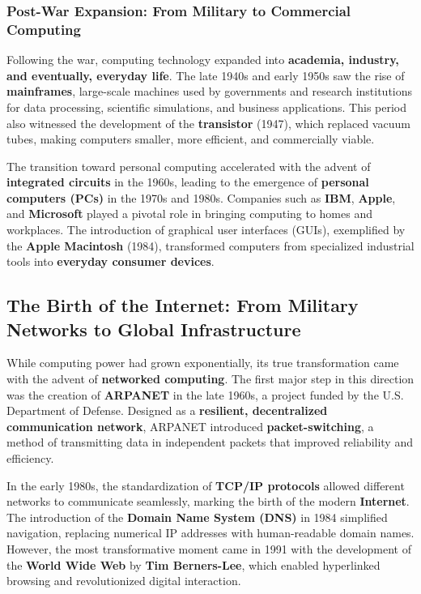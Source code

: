\subsubsection{Post-War Expansion: From Military to Commercial Computing}

Following the war, computing technology expanded into \textbf{academia, industry, and eventually, everyday life}. The late 1940s and early 1950s saw the rise of \textbf{mainframes}, large-scale machines used by governments and research institutions for data processing, scientific simulations, and business applications. This period also witnessed the development of the \textbf{transistor} (1947), which replaced vacuum tubes, making computers smaller, more efficient, and commercially viable.

The transition toward personal computing accelerated with the advent of \textbf{integrated circuits} in the 1960s, leading to the emergence of \textbf{personal computers (PCs)} in the 1970s and 1980s. Companies such as \textbf{IBM}, \textbf{Apple}, and \textbf{Microsoft} played a pivotal role in bringing computing to homes and workplaces. The introduction of graphical user interfaces (GUIs), exemplified by the \textbf{Apple Macintosh} (1984), transformed computers from specialized industrial tools into \textbf{everyday consumer devices}.

\subsection{The Birth of the Internet: From Military Networks to Global Infrastructure}

While computing power had grown exponentially, its true transformation came with the advent of \textbf{networked computing}. The first major step in this direction was the creation of \textbf{ARPANET} in the late 1960s, a project funded by the U.S. Department of Defense. Designed as a \textbf{resilient, decentralized communication network}, ARPANET introduced \textbf{packet-switching}, a method of transmitting data in independent packets that improved reliability and efficiency.

In the early 1980s, the standardization of \textbf{TCP/IP protocols} allowed different networks to communicate seamlessly, marking the birth of the modern \textbf{Internet}. The introduction of the \textbf{Domain Name System (DNS)} in 1984 simplified navigation, replacing numerical IP addresses with human-readable domain names. However, the most transformative moment came in 1991 with the development of the \textbf{World Wide Web} by \textbf{Tim Berners-Lee}, which enabled hyperlinked browsing and revolutionized digital interaction.

